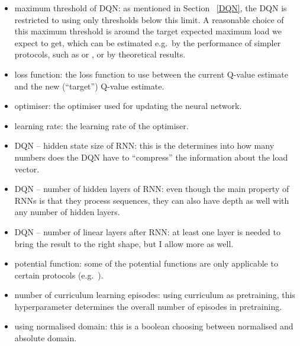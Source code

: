 \begin{itemize}
    \item maximum threshold of DQN: as mentioned in Section ~\ref{DQN}, the DQN is restricted to using only thresholds below this limit. A reasonable choice of this maximum threshold is around the target expected maximum load we expect to get, which can be estimated e.g.\ by the performance of simpler protocols, such as \OneChoice or \TwoChoice, or by theoretical results.
    
    \item loss function: the loss function to use between the current Q-value estimate and the new (``target'') Q-value estimate. 
    
    \item optimiser: the optimiser used for updating the neural network. 
    
    \item learning rate: the learning rate of the optimiser. 
    
    \item DQN -- hidden state size of RNN: this is the determines into how many numbers does the DQN have to ``compress'' the information about the load vector.
    
    \item DQN -- number of hidden layers of RNN: even though the main property of RNNs is that they process sequences, they can also have depth as well with any number of hidden layers.
    
    \item DQN -- number of linear layers after RNN: at least one layer is needed to bring the result to the right shape, but I allow more as well.
    
    \item potential function: some of the potential functions are only applicable to certain protocols (e.g.\ \GraphicalTwoChoice).
    
    \item number of curriculum learning episodes: using curriculum as pretraining, this hyperparameter determines the overall number of episodes in pretraining.
    
    \item using normalised domain: this is a boolean choosing between normalised and absolute domain.
    
    


\end{itemize}



